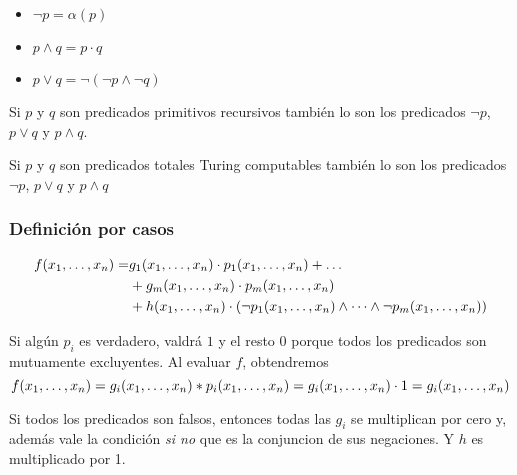 	\begin{demo}
	\begin{itemize}
	\item $\lnot p = \alpha(p)$
	\item $p\land q = p \cdot q$
	\item $p \lor q = \lnot(\lnot p \land \lnot q)$ 
	\end{itemize}
	\end{demo}
	
	\begin{corolario}
	Si $p$ y $q$ son predicados primitivos recursivos también lo son los predicados $\lnot p$, $p\lor q$ y $p\land q$.
	\end{corolario}
	
	\begin{corolario}
Si $p$ y $q$ son predicados totales Turing computables también lo son los predicados $\lnot p$, $p\lor q$ y $p\land q$
		\end{corolario}
	
	\subsubsection{Definición por casos}
\begin{demo}
	\vspace*{-0.5cm}
\begin{align*}
	f(x_1,\dots, x_{n}) = &g_1(x_1,\dots, x_{n})\cdot p_1(x_1,\dots, x_{n}) + \dots \\ &+ g_m(x_1,\dots, x_{n})\cdot p_m(x_1,\dots, x_{n}) \\ &+ h(x_1,\dots, x_{n})\cdot(\lnot p_1(x_1,\dots, x_{n})\land\cdots\land \lnot p_m(x_1,\dots, x_{n}))
\end{align*}

Si algún $p_i$ es verdadero, valdrá $1$ y el resto $0$ porque todos los predicados son mutuamente excluyentes. Al evaluar $f$, obtendremos $$f(x_1,\dots, x_{n}) = g_i(x_1,\dots, x_{n})*p_i(x_1,\dots, x_{n}) = g_i(x_1,\dots, x_{n})\cdot 1 = g_i(x_1,\dots, x_{n})$$

Si todos los predicados son falsos, entonces todas las $g_i$ se multiplican por cero y, además vale la condición \textit{si no} que es la conjuncion de sus negaciones. Y $h$ es multiplicado por 1.
\end{demo}

